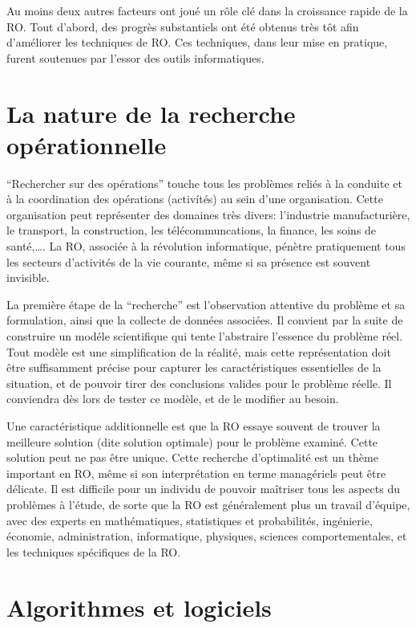 Au moins deux autres facteurs ont joué un rôle clé dans la croissance rapide de la RO.
Tout d'abord, des progrès substantiels ont été obtenus très tôt afin d'améliorer les techniques de RO.
Ces techniques, dans leur mise en pratique, furent soutenues par l'essor des outils informatiques.

\section{La nature de la recherche opérationnelle}
\label{sec:nature_ro}

``Rechercher sur des opérations'' touche tous les problèmes reliés à la conduite et à la coordination des opérations (activítés) au sein d'une organisation.
Cette organisation peut représenter des domaines très divers: l'industrie manufacturière, le transport, la construction, les télécommuncations, la finance, les soins de santé,\ldots.
La RO, associée à la révolution informatique, pénètre pratiquement tous les secteurs d'activités de la vie courante, même si sa présence est souvent invisible.

La première étape de la ``recherche'' est l'observation attentive du problème et sa formulation, ainsi que la collecte de données associées.
Il convient par la suite de construire un modéle scientifique qui tente l'abstraire l'essence du problème réel.
Tout modèle est une simplification de la réalité, mais cette représentation doit être suffisamment précise pour capturer les caractéristiques essentielles de la situation, et de pouvoir tirer des conclusions valides pour le problème réelle.
Il conviendra dès lors de tester ce modèle, et de le modifier au besoin.

Une caractéristique additionnelle est que la RO essaye souvent de trouver la meilleure solution (dite solution optimale) pour le problème examiné.
Cette solution peut ne pas être unique.
Cette recherche d'optimalité est un thème important en RO, même si son interprétation en terme managériels peut être délicate.
Il est difficile pour un individu de pouvoir maîtriser tous les aspects du problèmes à l'étude, de sorte que la RO est généralement plus un travail d'équipe, avec des experts en mathématiques, statistiques et probabilités, ingénierie, économie, administration, informatique, physiques, sciences comportementales, et les techniques spécifiques de la RO.



\section{Algorithmes et logiciels}

